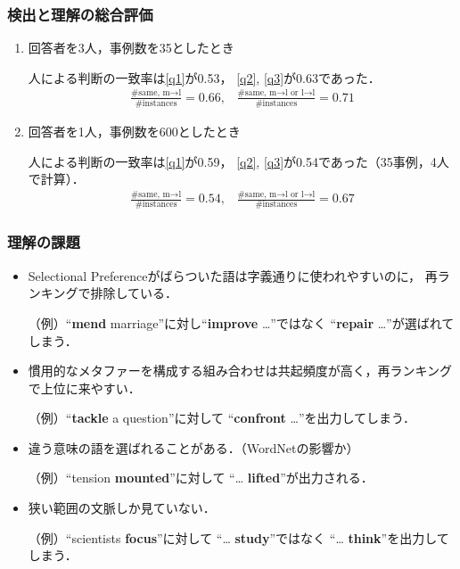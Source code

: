 \documentclass[11pt]{beamer}
\newcommand\enumref[1]{\textcolor{sRed}{\ref{#1}}}
\newcommand\metaphorical[1]{\textcolor{sRed}{\textbf{#1}}}
\newcommand\literal[1]{\textcolor{sDarkBlue}{\textbf{#1}}}
\begin{document}
\begin{frame}
\frametitle{検出と理解の総合評価}
\setlength{\leftmargini}{0em}
\begin{enumerate}
\item 回答者を3人，事例数を35としたとき

人による判断の一致率は\enumref{q1}が0.53，
\enumref{q2}, \enumref{q3}が0.63であった．
\begin{align*}
    \frac{\text{\# same, m→l}}{\text{\# instances}} = \text{0.66,}\quad
    \frac{\text{\# same, m→l or l→l}}{\text{\# instances}} = \text{0.71}
\end{align*}

\item 回答者を1人，事例数を600としたとき

人による判断の一致率は\enumref{q1}が0.59，
\enumref{q2}, \enumref{q3}が0.54であった（35事例，4人で計算）．
\begin{align*}
    \frac{\text{\# same, m→l}}{\text{\# instances}} = \text{0.54,}\quad
    \frac{\text{\# same, m→l or l→l}}{\text{\# instances}} = \text{0.67}
\end{align*}

\end{enumerate}
\end{frame}

\begin{frame}
\frametitle{理解の課題}
\setlength{\leftmargini}{0em}
\begin{itemize}
    \item Selectional Preferenceがばらついた語は字義通りに使われやすいのに，
        再ランキングで排除している．

        （例）“\metaphorical{mend} marriage”に対し“\literal{improve} …”ではなく
        “\metaphorical{repair} …”が選ばれてしまう．

    \item 慣用的なメタファーを構成する組み合わせは共起頻度が高く，再ランキングで上位に来やすい．

        （例）“\metaphorical{tackle} a question”に対して
        “\metaphorical{confront} …”を出力してしまう．

    \item 違う意味の語を選ばれることがある．（WordNetの影響か）

        （例）“tension \metaphorical{mounted}”に対して
        “… \metaphorical{lifted}”が出力される．

    \item 狭い範囲の文脈しか見ていない．

        （例）“scientists \metaphorical{focus}”に対して
        “… \literal{study}”ではなく
        “… \literal{think}”を出力してしまう．
\end{itemize}
\end{frame}
\end{document}
